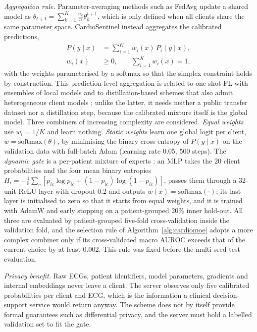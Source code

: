 \textit{Aggregation rule.} Parameter-averaging methods such as FedAvg \cite{mcmahan2017fedavg} update
a shared model as $\theta_{t+1}=\sum_{k=1}^{K}\frac{n_k}{n}\theta_k^{t+1}$, which is only defined
when all clients share the same parameter space. CardioSentinel instead aggregates the calibrated
predictions,
\begin{equation}
\label{eq:gate}
\begin{split}
P(y\mid x)&=\sum_{i=1}^{K} w_i(x)\,P_i(y\mid x),\\
w_i(x)&\ge 0,\qquad \sum_{i=1}^{K} w_i(x)=1,
\end{split}
\end{equation}
with the weights parameterised by a softmax so that the simplex constraint holds by construction.
This prediction-level aggregation is related to one-shot FL with ensembles of local models
\cite{guha2019oneshot} and to distillation-based schemes that also admit heterogeneous client models
\cite{li2019fedmd,lin2020feddf}; unlike the latter, it needs neither a public transfer dataset nor a
distillation step, because the calibrated mixture itself is the global model.
Three combiners of increasing complexity are considered. \emph{Equal weights} use $w_i=1/K$ and learn
nothing. \emph{Static weights} learn one global logit per client, $w=\mathrm{softmax}(\theta)$, by
minimising the binary cross-entropy of $P(y\mid x)$ on the validation data with full-batch Adam
(learning rate 0.05, 500 steps). The \emph{dynamic gate} is a per-patient mixture of experts
\cite{jacobs1991moe}: an MLP takes the 20 client probabilities and the four mean binary entropies
$H_i=-\frac{1}{5}\sum_c[p_{ic}\log p_{ic}+(1-p_{ic})\log(1-p_{ic})]$, passes them through a 32-unit
ReLU layer with dropout 0.2 and outputs $w(x)=\mathrm{softmax}(\cdot)$; its last layer is
initialised to zero so that it starts from equal weights, and it is trained with AdamW and early
stopping on a patient-grouped 20\% inner hold-out. All three are evaluated by patient-grouped
five-fold cross-validation inside the validation fold, and the selection rule of
Algorithm~\ref{alg:cardiomoe} adopts a more complex combiner only if its cross-validated macro AUROC
exceeds that of the current choice by at least 0.002. This rule was fixed before the multi-seed test
evaluation.

\textit{Privacy benefit.} Raw ECGs, patient identifiers, model parameters, gradients and internal
embeddings never leave a client. The server observes only five calibrated probabilities per client
and ECG, which is the information a clinical decision-support service would return anyway. The
scheme does not by itself provide formal guarantees such as differential privacy, and the server
must hold a labelled validation set to fit the gate.

